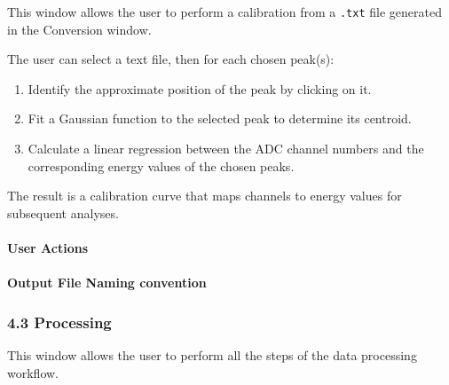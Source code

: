This window allows the user to perform a calibration from a
\texttt{.txt} file generated in the Conversion window.

The user can select a text file, then for each chosen peak(s):

\begin{enumerate}
\def\labelenumi{\arabic{enumi}.}
\tightlist
\item
  Identify the approximate position of the peak by clicking on it.
\item
  Fit a Gaussian function to the selected peak to determine its
  centroid.
\item
  Calculate a linear regression between the ADC channel numbers and the
  corresponding energy values of the chosen peaks.
\end{enumerate}

The result is a calibration curve that maps channels to energy values
for subsequent analyses.

\hypertarget{user-actions-1}{%
\paragraph{User Actions}\label{user-actions-1}}

\hypertarget{output-file-naming-convention}{%
\paragraph{Output File Naming
convention}\label{output-file-naming-convention}}

\hypertarget{processing}{%
\subsubsection{4.3 Processing}\label{processing}}

This window allows the user to perform all the steps of the data
processing workflow.

